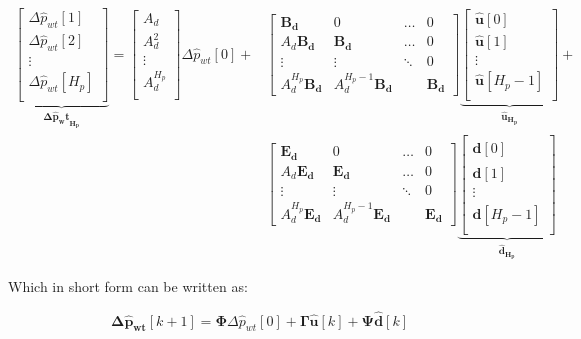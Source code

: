 \begin{align}
\underbrace{\begin{bmatrix}
\Delta \hat p_{wt}[1] \\ 
\Delta \hat p_{wt}[2]\\ 
\vdots \\ 
\Delta \hat p_{wt}[H_p]\\ 
\end{bmatrix}}_{\bm{{\Delta \hat{p}_wt}_{H_p}}}
=
\begin{bmatrix}
A_d \\ 
A_d^2\\ 
\vdots \\ 
A_d^{H_p}\\ 
\end{bmatrix}
\Delta \hat{p}_{wt}[0]+\nonumber
&\begin{bmatrix}
 \bm{B_d}& 0 & \hdots  & 0\\ 
 A_d\bm{B_d}&  \bm{B_d}& \hdots & 0\\ 
\vdots &\vdots  & \ddots  & 0\\ 
 A_d^{H_p}\bm{B_d}& A_d^{H_p-1}\bm{B_d}  &  & \bm{B_d}
\end{bmatrix}
\underbrace{\begin{bmatrix}
 \bm{\hat{u}}[0] \\ 
 \bm{\hat{u}}[1]\\ 
\vdots \\ 
 \bm{\hat{u}}[H_p-1]\\ 
\end{bmatrix}}_{\bm{\hat{u}_{H_p}}}
+ \\
&\begin{bmatrix}
 \bm{E_d}& 0 & \hdots  & 0\\ 
 A_d\bm{E_d}&  \bm{E_d}& \hdots & 0\\ 
\vdots &\vdots  & \ddots  & 0\\ 
 A_d^{H_p}\bm{E_d}& A_d^{H_p-1}\bm{E_d}  &  & \bm{E_d}
\end{bmatrix}
\underbrace{\begin{bmatrix}
 \bm{\hat{d}}[0] \\ 
 \bm{\hat{d}}[1]\\ 
\vdots \\ 
 \bm{\hat{d}}[H_p-1]\\ 
\end{bmatrix}}_{\bm{\hat{d}_{H_p}}} 
\end{align}

Which in short form can be written as: 

\begin{equation}
	\bm{\Delta \hat p_{wt}} [k+1] = \bm{\Phi} \Delta \hat p_{wt}[0] + \bm{\Gamma \hat{u}}[k] + \bm{\Psi} \bm{\hat{d}}[k]
	\label{extendedmatrix}
\end{equation}

